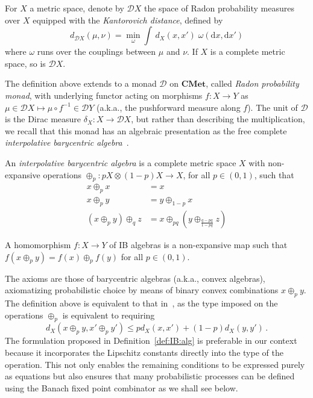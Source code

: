 \documentclass[a4paper,UKenglish,cleveref, autoref, thm-restate]{lipics-v2021}
\newcommand{\cat}[1]{\mathbf{#1}}
\newcommand{\CMet}{\cat{CMet}}
\newcommand{\mprod}{\otimes}
\newcommand{\D}{\mathcal{D}}
\begin{document}
For $X$ a metric space, denote by $\D X$ the space of Radon probability measures over $X$ equipped with the 
\emph{Kantorovich distance}, defined by
\begin{equation} \label{eq:Kantorovic}
d_{\D X}(\mu,\nu) = \min_{\omega} \int \, d_X(x,x') \; {\omega(\mathrm{d}x,\mathrm{d}x')}
\end{equation}
where $\omega$ runs over the couplings between $\mu$ and $\nu$.
If $X$ is a complete metric space, so is $\D X$. 

The definition above extends to a monad $\D$ on $\CMet$, called \emph{Radon probability monad}, with underlying functor acting on morphisms $f\colon X \to Y$ as $\mu \in \D X \mapsto \mu \circ f^{-1} \in \D Y$ (a.k.a., the pushforward measure along $f$).
The unit of $\D$ is the Dirac measure $\delta_X \colon X\to \D X$, but rather than describing the multiplication,
we recall that this monad has an algebraic presentation as the free complete
\emph{interpolative
barycentric algebra}~\cite{MardarePP16,MardarePP18}.
\begin{definition}[IB Algebra]
\label{def:IB:alg}
An \emph{interpolative barycentric algebra} is a complete metric space $X$ with non-expansive operations $\oplus_p \colon pX \mprod(1-p) X \to X$, for all $p \in (0,1)$, such that
\begin{align*}
    x \oplus_p x &= x \tag{\sc idem} \\
    x \oplus_p y &= y \oplus_{1-p} x\tag{\sc comm} \\
    (x \oplus_p y) \oplus_q z 
    &= x \oplus_{pq} (y \oplus_{\frac{q-pq}{1-pq}} z) \tag{\sc assoc} %
\end{align*}

A homomorphism $f \colon X \to Y$ of IB algebras is a non-expansive map such that $f(x \oplus_p y) = f(x) \oplus_p f(y)$ for all $p \in (0,1)$.
\end{definition}
The axioms are those of barycentric algebras (a.k.a., convex algebras), axiomatizing  probabilistic choice by means of binary convex combinations $x \oplus_p y$. 
The definition above is equivalent to that in~\cite{MardarePP18}, as the
type imposed on the operations $\oplus_p$ is 
equivalent to requiring
\[
   d_X(x \oplus_p y, x' \oplus_p y')  \leq p d_X(x,x') + (1-p) d_X(y,y') \,. %
\]
The formulation proposed in Definition~\ref{def:IB:alg} is preferable in our context because it incorporates the Lipschitz constants directly into the type of the operation. This not only enables the remaining conditions to be expressed purely as equations but also ensures that many probabilistic processes can be defined using the Banach fixed point combinator
as we shall see below.
\end{document}
